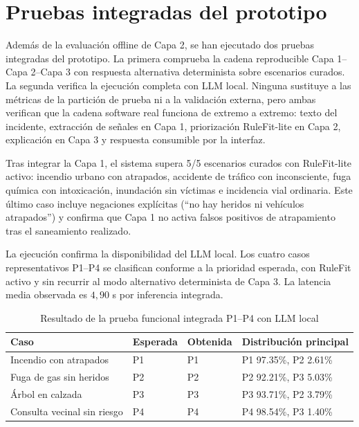 \section{Pruebas integradas del prototipo}

Además de la evaluación offline de Capa 2, se han ejecutado dos pruebas integradas del
prototipo. La primera comprueba la cadena reproducible Capa 1--Capa 2--Capa 3 con
respuesta alternativa determinista sobre escenarios curados. La segunda verifica la ejecución completa con
LLM local. Ninguna sustituye a las métricas de la partición de prueba ni a la validación externa, pero
ambas verifican que la cadena software real funciona de extremo a extremo: texto del
incidente, extracción de señales en Capa 1, priorización RuleFit-lite en Capa 2,
explicación en Capa 3 y respuesta consumible por la interfaz.

Tras integrar la Capa 1, el sistema supera 5/5 escenarios curados con RuleFit-lite activo:
incendio urbano con atrapados, accidente de tráfico con inconsciente, fuga química con
intoxicación, inundación sin víctimas e incidencia vial ordinaria. Este último caso
incluye negaciones explícitas (``no hay heridos ni vehículos atrapados'') y confirma
que Capa 1 no activa falsos positivos de atrapamiento tras el saneamiento realizado.

La ejecución confirma la disponibilidad del LLM local. Los cuatro casos representativos P1--P4 se
clasifican conforme a la prioridad esperada, con RuleFit activo y sin recurrir al modo
alternativo determinista de Capa 3. La latencia media observada es \(4{,}90\) s por inferencia
integrada.

\begin{table}[ht]
\centering
\caption{Resultado de la prueba funcional integrada P1--P4 con LLM local}
\label{tab:9-smoke-prototipo}
\small
\begin{tabularx}{\textwidth}{|p{3.6cm}|p{1.7cm}|p{1.7cm}|X|}
\hline
\textbf{Caso} & \textbf{Esperada} & \textbf{Obtenida} & \textbf{Distribución principal} \\ \hline
Incendio con atrapados & P1 & P1 & P1 97.35\%, P2 2.61\% \\ \hline
Fuga de gas sin heridos & P2 & P2 & P2 92.21\%, P3 5.03\% \\ \hline
Árbol en calzada & P3 & P3 & P3 93.71\%, P2 3.79\% \\ \hline
Consulta vecinal sin riesgo & P4 & P4 & P4 98.54\%, P3 1.40\% \\ \hline
\end{tabularx}
\end{table}

